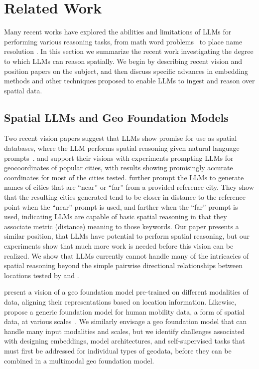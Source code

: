 \section{Related Work}
\label{section:related}
\normalsize

Many recent works have explored the abilities and limitations of LLMs for performing various reasoning tasks, from math word problems~\cite{Gao2023, Badaro2023} to place name resolution \cite{Mai2023}.
In this section we summarize the recent work investigating the degree to which LLMs can reason spatially.
We begin by describing recent vision and position papers on the subject, and then discuss specific advances in embedding methods and other techniques proposed to enable LLMs to ingest and reason over spatial data.


\subsection{Spatial LLMs and Geo Foundation Models}
Two recent vision papers suggest that LLMs show promise for use as spatial databases, where the LLM performs spatial reasoning given natural language prompts~\cite{Bhandari2023, Qi2023}.
\citeauthor{Bhandari2023} and \citeauthor{Qi2023} support their visions with experiments prompting LLMs for geocoordinates of popular cities, with results showing promisingly accurate coordinates for most of the cities tested.
\citeauthor{Bhandari2023} further prompt the LLMs to generate names of cities that are ``near'' or ``far'' from a provided reference city.
They show that the resulting cities generated tend to be closer in distance to the reference point when the ``near'' prompt is used, and farther when the ``far'' prompt is used, indicating LLMs are capable of basic spatial reasoning in that they associate metric (distance) meaning to those keywords.
%
%
Our paper presents a similar position, that LLMs have potential to perform spatial reasoning, but our experiments show that much more work is needed before this vision can be realized.
We show that LLMs currently cannot handle many of the intricacies of spatial reasoning beyond the simple pairwise directional relationships between locations tested by \citeauthor{Bhandari2023} and \citeauthor{Qi2023}.

\citeauthor{Mai2023} present a vision of a geo foundation model pre-trained on different modalities of data, aligning their representations based on location information.
Likewise, \citeauthor{Fei2022} propose a generic foundation model for human mobility data, a form of spatial data, at various scales~\cite{Fei2022}.
%
%
We similarly envisage a geo foundation model that can handle many input modalities and scales, but we identify challenges associated with designing embeddings, model architectures, and self-supervised tasks that must first be addressed for individual types of geodata, before they can be combined in a multimodal geo foundation model.

